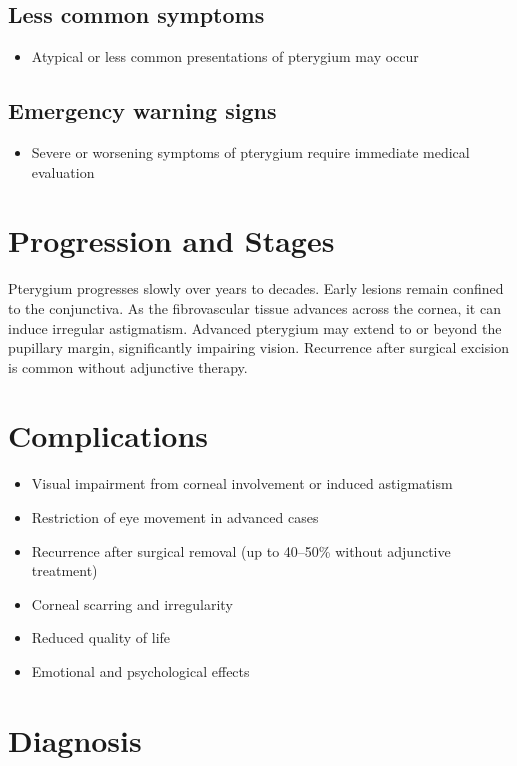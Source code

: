 \subsection{Less common symptoms}
\begin{itemize}[noitemsep]
  \item Atypical or less common presentations of pterygium may occur
\end{itemize}

\subsection{Emergency warning signs}
\begin{itemize}[noitemsep]
  \item Severe or worsening symptoms of pterygium require immediate medical evaluation
\end{itemize}
\section{Progression and Stages}
Pterygium progresses slowly over years to decades. Early lesions remain confined to the conjunctiva. As the fibrovascular tissue advances across the cornea, it can induce irregular astigmatism. Advanced pterygium may extend to or beyond the pupillary margin, significantly impairing vision. Recurrence after surgical excision is common without adjunctive therapy.

\section{Complications}

\begin{itemize}[noitemsep]
  \item Visual impairment from corneal involvement or induced astigmatism
  \item Restriction of eye movement in advanced cases
  \item Recurrence after surgical removal (up to 40--50\% without adjunctive treatment)
  \item Corneal scarring and irregularity
  \item Reduced quality of life
  \item Emotional and psychological effects
\end{itemize}

\section{Diagnosis}

